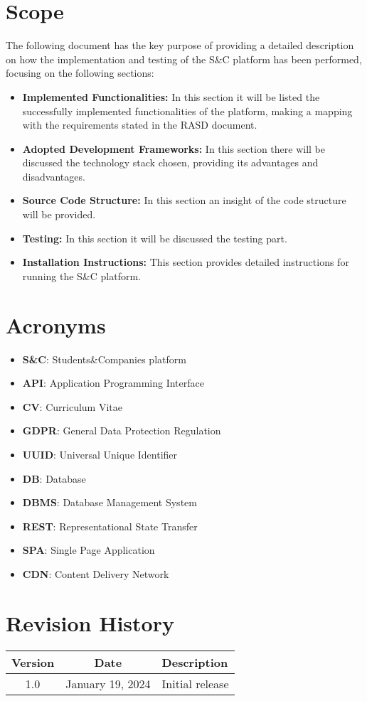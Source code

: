 \section{Scope}
The following document has the key purpose of providing a detailed description on how the implementation and testing of the S\&C platform has been performed, focusing on the following sections:
\begin{itemize}
    \item \textbf{Implemented Functionalities:} In this section it will be listed the successfully implemented functionalities of the platform, making a mapping with the requirements stated in the RASD document. 
    \item \textbf{Adopted Development Frameworks: } In this section there will be discussed the technology stack chosen, providing its advantages and disadvantages.
    \item \textbf{Source Code Structure: } In this section an insight of the code structure will be provided.
    \item \textbf{Testing: } In this section it will be discussed the testing part.
    \item \textbf{Installation Instructions: } This section provides detailed instructions for running the S\&C platform.
\end{itemize}

\section{Acronyms}
\begin{itemize}
    \item \textbf{S\&C}: Students\&Companies platform
    \item \textbf{API}: Application Programming Interface
    \item \textbf{CV}: Curriculum Vitae
    \item \textbf{GDPR}: General Data Protection Regulation
    \item \textbf{UUID}: Universal Unique Identifier
    \item \textbf{DB}: Database
    \item \textbf{DBMS}: Database Management System
    \item \textbf{REST}: Representational State Transfer
    \item \textbf{SPA}: Single Page Application
    \item \textbf{CDN}: Content Delivery Network
\end{itemize}

\section{Revision History}
\begin{table}[h!]
\centering
\begin{tabular}{|c|c|l|}
\hline
\textbf{Version} & \textbf{Date} & \textbf{Description} \\ \hline
1.0 & January 19, 2024 & Initial release \\ \hline
\end{tabular}
\end{table}

